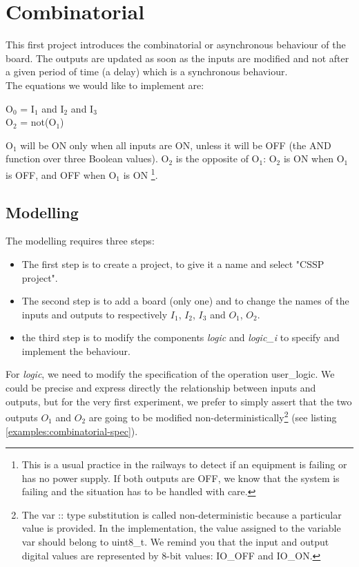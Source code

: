 \chapter{Combinatorial}

This first project introduces the combinatorial or asynchronous behaviour of the board. The outputs are updated as soon as the inputs are modified and not after a given period of time (a delay) which is a synchronous behaviour.\\
The equations we would like to implement are:
\begin{center}
O$_0$ = I$_1$ and I$_2$ and I$_3$\\
O$_2$ = not(O$_1$)    
\end{center}
O$_1$ will be ON only when all inputs are ON, unless it will be OFF (the AND function over three Boolean values). O$_2$ is the opposite of O$_1$: O$_2$ is ON when O$_1$ is OFF, and OFF when O$_1$ is ON \footnote{This is a usual practice in the railways to detect if an equipment is failing or has no power supply. If both outputs are OFF, we know that the system is failing and the situation has to be handled with care.}.

\section{Modelling}

The modelling requires three steps:
\begin{itemize}
    \item The first step is to create a project, to give it a name and select "CSSP project".
    \item The second step is to add a board (only one) and to change the names of the inputs and outputs to respectively $I_1$, $I_2$, $I_3$ and $O_1$, $O_2$.
    \item the third step is to modify the components \textit{logic} and \textit{logic\_i} to specify and implement the behaviour. 
\end{itemize}
 


For \textit{logic}, we need to modify the specification of the operation user\_logic. We could be precise and express directly the relationship between inputs and outputs, but for the very first experiment, we prefer to simply assert that the two outputs $O_1$ and $O_2$ are going to be modified non-deterministically\footnote{The var :: type substitution is called non-deterministic because a particular value is provided. In the implementation, the value assigned to the variable var should belong to uint8\_t. We remind you that the input and output digital values are represented by 8-bit values: IO\_OFF and IO\_ON.} (see listing \ref{examples:combinatorial-spec}). 

